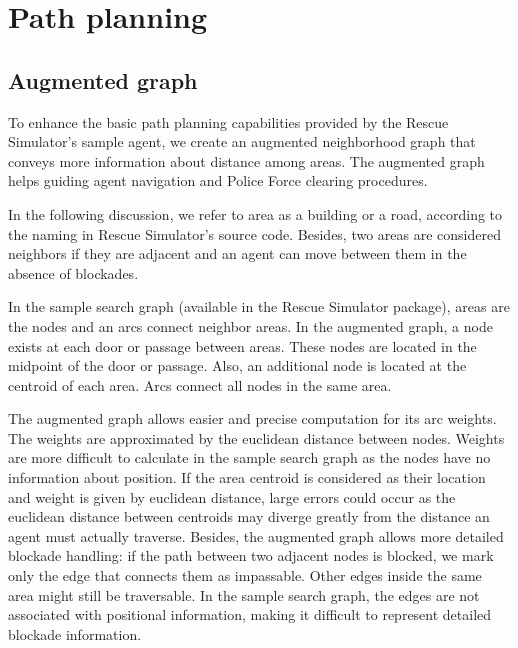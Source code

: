 \section{Path planning}
\label{sec:path}

\subsection{Augmented graph}
\label{sec:augraph}
To enhance the basic path planning capabilities provided by the Rescue Simulator's sample agent, we create an augmented neighborhood graph that conveys more information about distance among areas. The augmented graph helps guiding agent navigation and Police Force clearing procedures.

In the following discussion, we refer to area as a building or a road, according to the naming in Rescue Simulator's source code. Besides, two areas are considered neighbors if they are adjacent and an agent can move between them in the absence of blockades.

In the sample search graph (available in the Rescue Simulator package), areas are the nodes and an arcs connect neighbor areas. In the augmented graph, a node exists at each door or passage between areas. These nodes are located in the midpoint of the door or passage. Also, an additional node is located at the centroid of each area. Arcs connect all nodes in the same area. 

The augmented graph allows easier and precise computation for its arc weights. The weights are approximated by the euclidean distance between nodes. Weights are more difficult to calculate in the sample search graph as the nodes have no information about position. If the area centroid is considered as their location and weight is given by euclidean distance, large errors could occur as the euclidean distance between centroids may diverge greatly from the distance an agent must actually traverse. Besides, the augmented graph allows more detailed blockade handling: if the path between two adjacent nodes is blocked, we mark only the edge that connects them as impassable. Other edges inside the same area might still be traversable. In the sample search graph, the edges are not associated with positional information, making it difficult to represent detailed blockade information.

%

